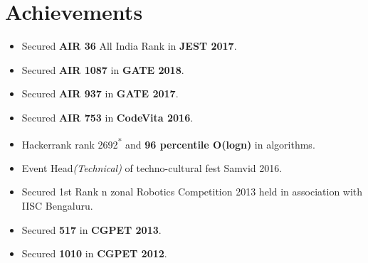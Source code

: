 \documentclass[letterpaper,11pt]{article}
\newcommand{\resumeSubHeadingListStart}{\begin{itemize}[leftmargin=*]}
\newcommand{\resumeSubHeadingListEnd}{\end{itemize}}
\begin{document}
\section{Achievements}
\resumeSubHeadingListStart
    \itemsep-0.25em 
    \item Secured \textbf{AIR 36} All India Rank in \textbf{JEST 2017}.
    \item Secured \textbf{AIR 1087} in \textbf{GATE 2018}.
    \item Secured \textbf{AIR 937} in \textbf{GATE 2017}.
    \item Secured \textbf{AIR 753} in \textbf{CodeVita 2016}.
    \item Hackerrank rank 2692\textsuperscript{*} and \textbf{96 percentile O(logn)} in algorithms.
    \item Event Head\emph{(Technical)} of techno-cultural fest Samvid 2016.
    \item Secured 1st Rank n zonal Robotics Competition 2013 held in association with IISC Bengaluru.
    \item Secured \textbf{517} in \textbf{CGPET 2013}.
    \item Secured \textbf{1010} in \textbf{CGPET 2012}.
    
  \resumeSubHeadingListEnd

%


\end{document}
